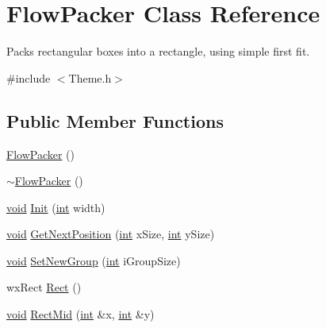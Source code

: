 \hypertarget{class_flow_packer}{}\section{Flow\+Packer Class Reference}
\label{class_flow_packer}


Packs rectangular boxes into a rectangle, using simple first fit.  




{\ttfamily \#include $<$Theme.\+h$>$}

\subsection*{Public Member Functions}
\begin{DoxyCompactItemize}
\item 
\hyperlink{class_flow_packer_a638175e4d2236df0250e469f6c345a97}{Flow\+Packer} ()
\item 
\hyperlink{class_flow_packer_a6889242c5dfa6e77aa583e68045eeae2}{$\sim$\+Flow\+Packer} ()
\item 
\hyperlink{sound_8c_ae35f5844602719cf66324f4de2a658b3}{void} \hyperlink{class_flow_packer_a081475edbd32e093cb7673189dabb7ad}{Init} (\hyperlink{xmltok_8h_a5a0d4a5641ce434f1d23533f2b2e6653}{int} width)
\item 
\hyperlink{sound_8c_ae35f5844602719cf66324f4de2a658b3}{void} \hyperlink{class_flow_packer_a9dee23860a18ef41798841b40fb3d97e}{Get\+Next\+Position} (\hyperlink{xmltok_8h_a5a0d4a5641ce434f1d23533f2b2e6653}{int} x\+Size, \hyperlink{xmltok_8h_a5a0d4a5641ce434f1d23533f2b2e6653}{int} y\+Size)
\item 
\hyperlink{sound_8c_ae35f5844602719cf66324f4de2a658b3}{void} \hyperlink{class_flow_packer_a30c80c204073fadf69e00d7af2f45051}{Set\+New\+Group} (\hyperlink{xmltok_8h_a5a0d4a5641ce434f1d23533f2b2e6653}{int} i\+Group\+Size)
\item 
wx\+Rect \hyperlink{class_flow_packer_ac1f8059da946291fd9bd31e2a603ff64}{Rect} ()
\item 
\hyperlink{sound_8c_ae35f5844602719cf66324f4de2a658b3}{void} \hyperlink{class_flow_packer_a4e6fb23b0919a4aa3a5c6bb0f893e2a9}{Rect\+Mid} (\hyperlink{xmltok_8h_a5a0d4a5641ce434f1d23533f2b2e6653}{int} \&x, \hyperlink{xmltok_8h_a5a0d4a5641ce434f1d23533f2b2e6653}{int} \&y)
\end{DoxyCompactItemize}
